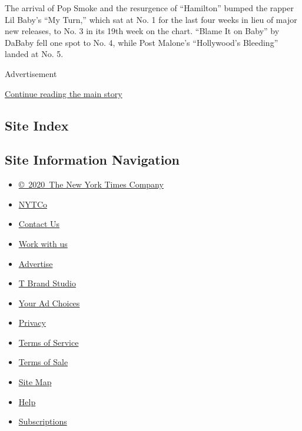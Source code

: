 The arrival of Pop Smoke and the resurgence of ``Hamilton'' bumped the
rapper Lil Baby's ``My Turn,'' which sat at No. 1 for the last four
weeks in lieu of major new releases, to No. 3 in its 19th week on the
chart. ``Blame It on Baby'' by DaBaby fell one spot to No. 4, while Post
Malone's ``Hollywood's Bleeding'' landed at No. 5.

Advertisement

\protect\hyperlink{after-bottom}{Continue reading the main story}

\hypertarget{site-index}{%
\subsection{Site Index}\label{site-index}}

\hypertarget{site-information-navigation}{%
\subsection{Site Information
Navigation}\label{site-information-navigation}}

\begin{itemize}
\tightlist
\item
  \href{https://help.nytimes3xbfgragh.onion/hc/en-us/articles/115014792127-Copyright-notice}{©~2020~The
  New York Times Company}
\end{itemize}

\begin{itemize}
\tightlist
\item
  \href{https://www.nytco.com/}{NYTCo}
\item
  \href{https://help.nytimes3xbfgragh.onion/hc/en-us/articles/115015385887-Contact-Us}{Contact
  Us}
\item
  \href{https://www.nytco.com/careers/}{Work with us}
\item
  \href{https://nytmediakit.com/}{Advertise}
\item
  \href{http://www.tbrandstudio.com/}{T Brand Studio}
\item
  \href{https://www.nytimes3xbfgragh.onion/privacy/cookie-policy\#how-do-i-manage-trackers}{Your
  Ad Choices}
\item
  \href{https://www.nytimes3xbfgragh.onion/privacy}{Privacy}
\item
  \href{https://help.nytimes3xbfgragh.onion/hc/en-us/articles/115014893428-Terms-of-service}{Terms
  of Service}
\item
  \href{https://help.nytimes3xbfgragh.onion/hc/en-us/articles/115014893968-Terms-of-sale}{Terms
  of Sale}
\item
  \href{https://spiderbites.nytimes3xbfgragh.onion}{Site Map}
\item
  \href{https://help.nytimes3xbfgragh.onion/hc/en-us}{Help}
\item
  \href{https://www.nytimes3xbfgragh.onion/subscription?campaignId=37WXW}{Subscriptions}
\end{itemize}
